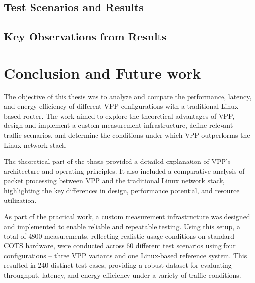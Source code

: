 \section{Test Scenarios and Results}





\newpage
\section{Key Observations from Results}



\chapter{Conclusion and Future work}
The objective of this thesis was to analyze and compare the performance, latency, and energy efficiency of different VPP configurations with a traditional Linux-based router. 
The work aimed to explore the theoretical advantages of VPP, design and implement a custom measurement infrastructure, define relevant traffic scenarios, 
and determine the conditions under which VPP outperforms the Linux network stack.

The theoretical part of the thesis provided a detailed explanation of VPP's architecture and operating principles. 
It also included a comparative analysis of packet processing between VPP and the traditional Linux network stack, highlighting the key differences in design, performance potential, and resource utilization.

As part of the practical work, a custom measurement infrastructure was designed and implemented to enable reliable and repeatable testing. 
Using this setup, a total of 4800 measurements, reflecting realistic usage conditions on standard COTS hardware, 
were conducted across 60 different test scenarios using four configurations -- three VPP variants and one Linux-based reference system.
This resulted in 240 distinct test cases, providing a robust dataset for evaluating throughput, latency, and energy efficiency under a variety of traffic conditions.



